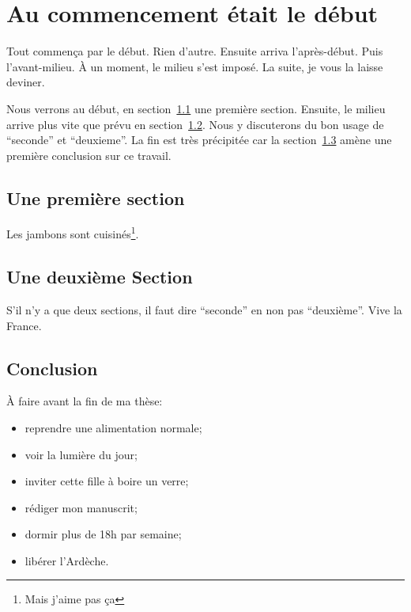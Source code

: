 \chapter{Au commencement était le début}\label{ch1}
	\minitoc




Tout commença par le début.
Rien d'autre.
Ensuite arriva l'après-début.
Puis l'avant-milieu.
À un moment, le milieu s'est imposé.
La suite, je vous la laisse deviner.

Nous verrons au début, en section~\ref{sect1:premiere} une première section.
Ensuite, le milieu arrive plus vite que prévu en section~\ref{sect1:deuxieme}.
Nous y discuterons du bon usage de \enquote{seconde} et \enquote{deuxieme}.
La fin est très précipitée car la section~\ref{sect1:ccl} amène une première conclusion sur ce travail.
\clearpage

\section{Une première section}\label{sect1:premiere}
    Les jambons sont cuisinés\footnote{Mais j'aime pas ça}.

\section{Une deuxième Section}\label{sect1:deuxieme}
    S'il n'y a que deux sections, il faut dire \enquote{seconde} en non pas \enquote{deuxième}.
    Vive la France.

\section{Conclusion}\label{sect1:ccl}
    À faire avant la fin de ma thèse:
    \begin{itemize}
        \item reprendre une alimentation normale;
        \item voir la lumière du jour;
        \item inviter cette fille à boire un verre;
        \item rédiger mon manuscrit;
        \item dormir plus de 18h par semaine;
        \item libérer l'Ardèche.
    \end{itemize}
